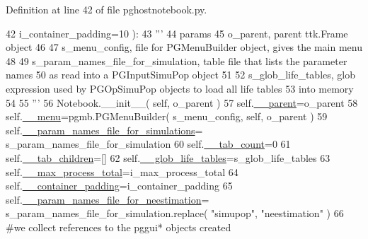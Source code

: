 Definition at line 42 of file pghostnotebook.\+py.


\begin{DoxyCode}
42                     i\_container\_padding=10 ):
43         \textcolor{stringliteral}{'''}
44 \textcolor{stringliteral}{        params }
45 \textcolor{stringliteral}{        o\_parent, parent ttk.Frame object}
46 \textcolor{stringliteral}{}
47 \textcolor{stringliteral}{        s\_menu\_config, file for PGMenuBuilder object, gives the main menu}
48 \textcolor{stringliteral}{}
49 \textcolor{stringliteral}{        s\_param\_names\_file\_for\_simulation, table file that lists the parameter names}
50 \textcolor{stringliteral}{           as read into a PGInputSimuPop object}
51 \textcolor{stringliteral}{}
52 \textcolor{stringliteral}{        s\_glob\_life\_tables, glob expression used by PGOpSimuPop objects to load all life tables}
53 \textcolor{stringliteral}{            into memory}
54 \textcolor{stringliteral}{}
55 \textcolor{stringliteral}{        '''}
56         Notebook.\_\_init\_\_( self, o\_parent )
57         self.\hyperlink{classnegui_1_1pghostnotebook_1_1PGHostNotebook_ae3a4078b5e41c208da268dfee99bb622}{\_\_parent}=o\_parent
58         self.\hyperlink{classnegui_1_1pghostnotebook_1_1PGHostNotebook_add1ab1bb7f792ff733e8236fed00218c}{\_\_menu}=pgmb.PGMenuBuilder( s\_menu\_config, self, o\_parent )
59         self.\hyperlink{classnegui_1_1pghostnotebook_1_1PGHostNotebook_a9b145ef56ff954c480d856859fcda86e}{\_\_param\_names\_file\_for\_simulations}=
      s\_param\_names\_file\_for\_simulation
60         self.\hyperlink{classnegui_1_1pghostnotebook_1_1PGHostNotebook_a84a7417cc57500cbe5c230449ba464b3}{\_\_tab\_count}=0
61         self.\hyperlink{classnegui_1_1pghostnotebook_1_1PGHostNotebook_aa3a7876014bd06be174732b7d814bfa8}{\_\_tab\_children}=[]
62         self.\hyperlink{classnegui_1_1pghostnotebook_1_1PGHostNotebook_af63d9ae9cde1ec2155d4dc81934d00c7}{\_\_glob\_life\_tables}=s\_glob\_life\_tables
63         self.\hyperlink{classnegui_1_1pghostnotebook_1_1PGHostNotebook_a14287e3e1cf5c33d9be0ff28d031fc04}{\_\_max\_process\_total}=i\_max\_process\_total
64         self.\hyperlink{classnegui_1_1pghostnotebook_1_1PGHostNotebook_a790570fc06951c4ccc142a26c01668ef}{\_\_container\_padding}=i\_container\_padding
65         self.\hyperlink{classnegui_1_1pghostnotebook_1_1PGHostNotebook_a38f70ee82a0a2852953b964623a4c871}{\_\_param\_names\_file\_for\_neestimation}=
      s\_param\_names\_file\_for\_simulation.replace( \textcolor{stringliteral}{"simupop"}, \textcolor{stringliteral}{"neestimation"} )
66         \textcolor{comment}{#we collect references to the pggui* objects created}

\end{DoxyCode}
